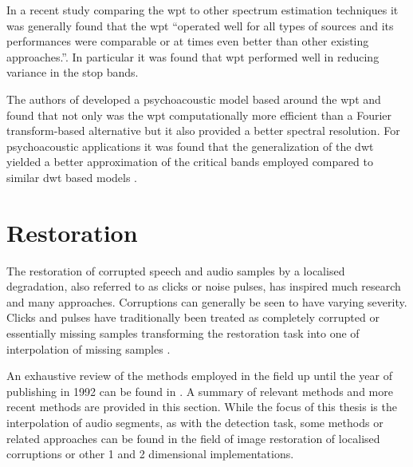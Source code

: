 In a recent study comparing the \DIFdelbegin {}\DIFdelend \DIFaddbegin \gls{wpt} \DIFaddend to other spectrum estimation techniques it was generally found that the \DIFdelbegin {}\DIFdelend \DIFaddbegin \gls{wpt} \DIFaddend ``operated well for all types of sources and its performances were comparable or at times even better than other existing \linebreak[0]approaches.''\linebreak[2]\cite{Ariananda2013}. In particular it was found that \DIFdelbegin {}\DIFdelend \DIFaddbegin \gls{wpt} \DIFaddend performed well in reducing variance in the stop bands.

The authors of \cite{He2008} developed a psychoacoustic model based around the \DIFdelbegin {}\DIFdelend \DIFaddbegin \gls{wpt} \DIFaddend and found that not only was the \DIFdelbegin {}\DIFdelend \DIFaddbegin \gls{wpt} \DIFaddend computationally more efficient than a Fourier transform-based alternative but it also provided a better spectral resolution. For psychoacoustic applications it was found that the generalization of the \DIFdelbegin {}\DIFdelend \DIFaddbegin \gls{dwt} \DIFaddend yielded a better approximation of the critical bands employed \cite{Carnero1999}\cite{He2008} compared to similar \DIFdelbegin {}\DIFdelend \DIFaddbegin \gls{dwt} \DIFaddend based models \cite{Sinha1993}\cite{Zurera2001}.

\section{Restoration}\label{sec:LitRev_Restoration}
The restoration of corrupted speech and audio samples by a localised degradation, also referred to as clicks or noise pulses, has inspired much research and many approaches. Corruptions can generally be seen to have varying severity. Clicks and pulses have traditionally been treated as completely corrupted or essentially missing samples transforming the restoration task into one of interpolation of missing samples \cite{Tukey1974}\cite{Tukey1977}\cite{Godsill1998book}.

An exhaustive review of the methods employed in the field up until the year of publishing in 1992 can be found in \cite{Veldhuis1992}. A summary of relevant methods and more recent methods are provided in this section. While the focus of this thesis is the interpolation of audio segments, as with the detection task, some methods or related approaches can be found in the field of image restoration of localised corruptions or other 1 and 2 dimensional implementations.

